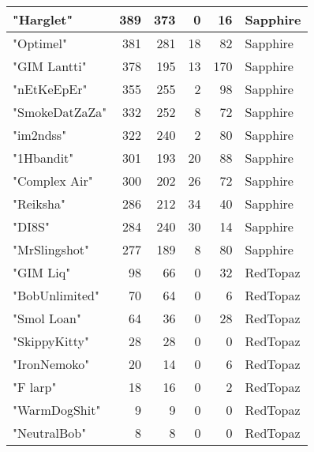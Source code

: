 \documentclass{article}
\begin{document}
\begin{table}[htbp]
\begin{tabular}{|l|r|r|r|r|l|}
"Harglet" & 389 & 373 & 0 & 16 & Sapphire \\ \hline
"Optimel" & 381 & 281 & 18 & 82 & Sapphire \\ \hline
"GIM Lantti" & 378 & 195 & 13 & 170 & Sapphire \\ \hline
"nEtKeEpEr" & 355 & 255 & 2 & 98 & Sapphire \\ \hline
"SmokeDatZaZa" & 332 & 252 & 8 & 72 & Sapphire \\ \hline
"im2ndss" & 322 & 240 & 2 & 80 & Sapphire \\ \hline
"1Hbandit" & 301 & 193 & 20 & 88 & Sapphire \\ \hline
"Complex Air" & 300 & 202 & 26 & 72 & Sapphire \\ \hline
"Reiksha" & 286 & 212 & 34 & 40 & Sapphire \\ \hline
"DI8S" & 284 & 240 & 30 & 14 & Sapphire \\ \hline
"MrSlingshot" & 277 & 189 & 8 & 80 & Sapphire \\ \hline
"GIM Liq" & 98 & 66 & 0 & 32 & RedTopaz \\ \hline
"BobUnlimited" & 70 & 64 & 0 & 6 & RedTopaz \\ \hline
"Smol Loan" & 64 & 36 & 0 & 28 & RedTopaz \\ \hline
"SkippyKitty" & 28 & 28 & 0 & 0 & RedTopaz \\ \hline
"IronNemoko" & 20 & 14 & 0 & 6 & RedTopaz \\ \hline
"F larp" & 18 & 16 & 0 & 2 & RedTopaz \\ \hline
"WarmDogShit" & 9 & 9 & 0 & 0 & RedTopaz \\ \hline
"NeutralBob" & 8 & 8 & 0 & 0 & RedTopaz \\ \hline
\end{tabular}
\end{table}
\end{document}
